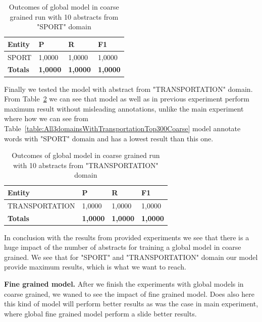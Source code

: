 \documentclass[thesis=M,english]{FITthesis}[2018/05/30]
\begin{document}
	\begin{table}[H]\centering
		\begin{tabular}{|l|l|l|l|}
			\hline {\textbf{Entity}} & {\textbf{P}} & {\textbf{R}} & {\textbf{F1}}\\\hline
				SPORT & 1,0000 & 1,0000 & 1,0000\\\hline
				\textbf{Totals} & \textbf{1,0000} & \textbf{1,0000} & \textbf{1,0000}\\\hline
		\end{tabular}
		\caption{Outcomes of global model in coarse grained run with 10 abstracts from "SPORT" domain \label{table:GlobalDomainWithSportTop10Coarse}}	
	\end{table}	

	Finally we tested the model with abstract from "TRANSPORTATION" domain. From Table~\ref{table:GlobalDomainWithTransportationTop10Coarse} we can see that model as well as in previous experiment perform maximum result without misleading annotations, unlike the main experiment where how we can see from Table~\ref{table:All3domainsWithTransportationTop300Coarse} model annotate words with "SPORT" domain and has a lowest result than this one.
	
	\begin{table}[H]\centering
		\begin{tabular}{|l|l|l|l|}
			\hline {\textbf{Entity}} & {\textbf{P}} & {\textbf{R}} & {\textbf{F1}}\\\hline
				TRANSPORTATION & 1,0000 & 1,0000 & 1,0000\\\hline
				\textbf{Totals} & \textbf{1,0000} & \textbf{1,0000} & \textbf{1,0000}\\\hline
		\end{tabular}
		\caption{Outcomes of global model in coarse grained run with 10 abstracts from "TRANSPORTATION" domain \label{table:GlobalDomainWithTransportationTop10Coarse}}	
	\end{table}

	In conclusion with the results from provided experiments we see that there is a huge impact of the number of abstracts for training a global model in coarse grained. We see that for "SPORT" and "TRANSPORTATION" domain our model provide maximum results, which is what we want to reach.


	\textbf{Fine grained model.} After we finish the experiments with global models in coarse grained, we waned to see the impact of fine grained model. Does also here this kind of model will perform better results as was the case in main experiment, where global fine grained model perform a slide better results.
	
\end{document}
